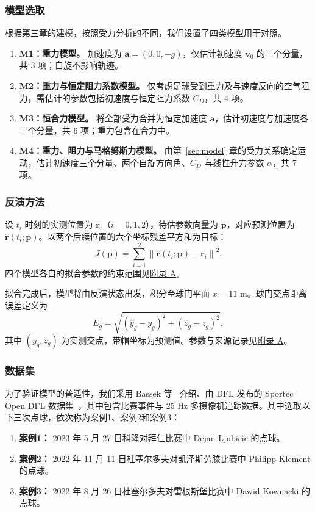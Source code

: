 \documentclass[12pt,letterpaper]{article}
\begin{document}
\subsubsection{模型选取}
根据第三章的建模，按照受力分析的不同，我们设置了四类模型用于对照。
\begin{enumerate}
\item \textbf{M1：重力模型。} 加速度为 $\boldsymbol a=(0,0,-g)$，仅估计初速度 $\boldsymbol v_0$ 的三个分量，共 3 项；自旋不影响轨迹。
\item \textbf{M2：重力与恒定阻力系数模型。} 仅考虑足球受到重力及与速度反向的空气阻力，需估计的参数包括初速度与恒定阻力系数 $C_D$，共 4 项。
\item \textbf{M3：恒合力模型。} 将全部受力合并为恒定加速度 $\boldsymbol a$，估计初速度与加速度各三个分量，共 6 项；重力包含在合力中。
\item \textbf{M4：重力、阻力与马格努斯力模型。} 由第~\ref{sec:model} 章的受力关系确定运动，估计初速度三个分量、两个自旋方向角、$C_D$ 与线性升力参数 $\alpha$，共 7 项。
\end{enumerate}

\subsubsection{反演方法}
设 $t_i$ 时刻的实测位置为 $\boldsymbol r_i$（$i=0,1,2$），待估参数向量为 $\boldsymbol p$，对应预测位置为 $\widehat{\boldsymbol r}(t_i;\boldsymbol p)$。以两个后续位置的六个坐标残差平方和为目标：
\[
J(\boldsymbol p)=\sum_{i=1}^{2}\left\|\widehat{\boldsymbol r}(t_i;\boldsymbol p)-\boldsymbol r_i\right\|^2.
\]
四个模型各自的拟合参数的约束范围见\hyperref[app:data]{附录 A}。

拟合完成后，模型将由反演状态出发，积分至球门平面 $x=11$ m。球门交点距离误差定义为
\begin{equation}
E_g=\sqrt{(\widehat y_g-y_g)^2+(\widehat z_g-z_g)^2},
\label{eq:prediction-errors}\end{equation}
其中 $(y_g,z_g)$ 为实测交点，带帽坐标为预测值。参数与来源记录见\hyperref[app:data]{附录 A}。

\subsubsection{数据集}
为了验证模型的普适性，我们采用 Bassek 等~\cite{bassek} 介绍、由 DFL 发布的 Sportec Open DFL 数据集~\cite{dataset}，其中包含比赛事件与 25 Hz 多摄像机追踪数据。其中选取以下三次点球，依次称为案例1、案例2和案例3：
\begin{enumerate}
\item \textbf{案例1：} 2023 年 5 月 27 日科隆对拜仁比赛中 Dejan Ljubicic 的点球。
\item \textbf{案例2：} 2022 年 11 月 11 日杜塞尔多夫对凯泽斯劳滕比赛中 Philipp Klement 的点球。
\item \textbf{案例3：} 2022 年 8 月 26 日杜塞尔多夫对雷根斯堡比赛中 Dawid Kownacki 的点球。
\end{enumerate}
\end{document}
